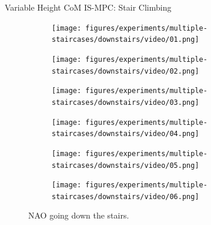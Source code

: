 \documentclass[10pt]{beamer}
\begin{document}
\begin{frame}{Variable Height CoM IS-MPC: Stair Climbing}
	\begin{figure}
		\begin{subfigure}{0.40\textwidth}
			\texttt{[image: figures/experiments/multiple-staircases/downstairs/video/01.png]}
		\end{subfigure}\hspace*{0.05cm}%
		\begin{subfigure}{0.40\textwidth}
			\texttt{[image: figures/experiments/multiple-staircases/downstairs/video/02.png]}
		\end{subfigure}
		\begin{subfigure}{0.40\textwidth}
			\texttt{[image: figures/experiments/multiple-staircases/downstairs/video/03.png]}
		\end{subfigure}\hspace*{0.05cm}%
		\begin{subfigure}{0.40\textwidth}
			\texttt{[image: figures/experiments/multiple-staircases/downstairs/video/04.png]}
		\end{subfigure}
		\begin{subfigure}{0.40\textwidth}
			\texttt{[image: figures/experiments/multiple-staircases/downstairs/video/05.png]}
		\end{subfigure}\hspace*{0.05cm}%
		\begin{subfigure}{0.40\textwidth}
			\texttt{[image: figures/experiments/multiple-staircases/downstairs/video/06.png]}
		\end{subfigure}
		\caption{NAO going down the stairs.}
	\end{figure}
\end{frame}
\end{document}
